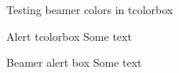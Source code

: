 \documentclass[t]{beamer}
\begin{document}
 
\begin{frame}{Testing beamer colors in tcolorbox}

\begin{myalertbox}{Alert tcolorbox}
Some text
\end{myalertbox}

\begin{alertblock}{Beamer alert box}
Some text
\end{alertblock}

\end{frame}
\end{document}
